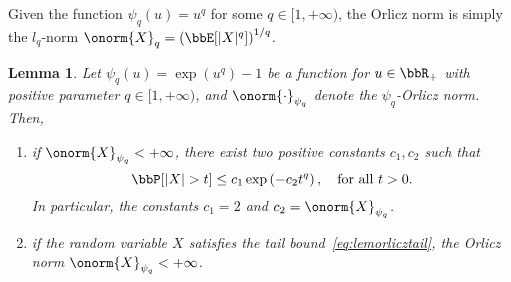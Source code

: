 \documentclass[11pt]{article}
\newcommand{\of}[1]{\left(#1\right)}
\theoremstyle{plain}
\newtheorem{lem}{Lemma}
\theoremstyle{definition}
\begin{document}
     Given the function $\psi_q(u) = u^{q}$ for some $q \in [1,+\infty)$, the Orlicz norm is simply the $l_q$-norm $\onorm{X}_q = \of{ \bbE[|X|^q] }^{1/q}$.

    \begin{lem}
    Let $\psi_q(u) = \exp(u^q) - 1$ be a function for $u \in \bbR_+$ with positive parameter $q \in [1,+\infty)$, and $\onorm{\cdot}_{\psi_q}$ denote the $\psi_q$-Orlicz norm. Then,
    \begin{enumerate}
    	\item[(a.)] if $\onorm{X}_{\psi_q} < +\infty$, there exist two positive constants $c_1,c_2$ such that
    	\begin{equation}\label{eq:lemorlicztail}
    		\bbP[|X| > t] \leq c_1 \exp \of{-c_2 t^q},\quad \text{for all } t > 0.
    	\end{equation}
    	In particular, the constants $c_1 = 2$ and $c_2 = \onorm{X}_{\psi_q}$.
    	
    	\item[(b.)] if the random variable $X$ satisfies the tail bound~\eqref{eq:lemorlicztail}, the Orlicz norm $\onorm{X}_{\psi_q} < +\infty$.
    \end{enumerate}
    \end{lem}
\end{document}
